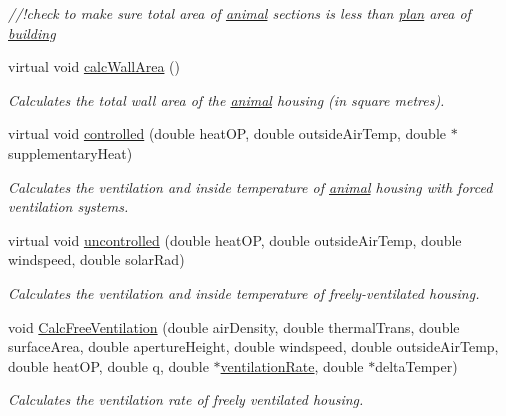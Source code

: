 \begin{DoxyCompactItemize}
\begin{DoxyCompactList}\small\item\em //!check to make sure total area of \hyperlink{classanimal}{animal} sections is less than \hyperlink{classplan}{plan} area of \hyperlink{classbuilding}{building} \item\end{DoxyCompactList}\item 
virtual void \hyperlink{classstable_a4f31b768e529147a0b6eb3053b7f32d6}{calcWallArea} ()
\begin{DoxyCompactList}\small\item\em Calculates the total wall area of the \hyperlink{classanimal}{animal} housing (in square metres). \item\end{DoxyCompactList}\item 
virtual void \hyperlink{classstable_a8cf231463ff53ad88d48885e5d063334}{controlled} (double heatOP, double outsideAirTemp, double $\ast$supplementaryHeat)
\begin{DoxyCompactList}\small\item\em Calculates the ventilation and inside temperature of \hyperlink{classanimal}{animal} housing with forced ventilation systems. \item\end{DoxyCompactList}\item 
virtual void \hyperlink{classstable_a28efbc6e9afeb220d069ac7ccba7343a}{uncontrolled} (double heatOP, double outsideAirTemp, double windspeed, double solarRad)
\begin{DoxyCompactList}\small\item\em Calculates the ventilation and inside temperature of freely-\/ventilated housing. \item\end{DoxyCompactList}\item 
void \hyperlink{classstable_a78d6cd91aa176da41ea04afc90dfc17b}{CalcFreeVentilation} (double airDensity, double thermalTrans, double surfaceArea, double apertureHeight, double windspeed, double outsideAirTemp, double heatOP, double q, double $\ast$\hyperlink{classstable_a934e5c5203ed1c98f304d28c119b219b}{ventilationRate}, double $\ast$deltaTemper)
\begin{DoxyCompactList}\small\item\em Calculates the ventilation rate of freely ventilated housing. \item\end{DoxyCompactList}\item 

\end{DoxyCompactItemize}
